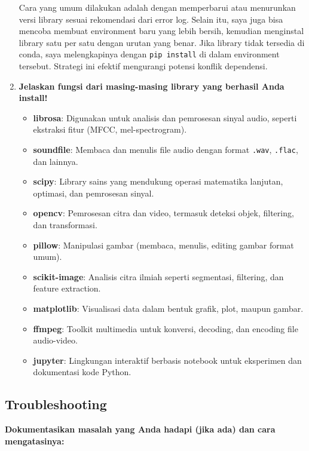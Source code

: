 \documentclass[11pt,a4paper]{article}
\begin{document}
\begin{enumerate}
    Cara yang umum dilakukan adalah dengan memperbarui atau menurunkan versi library sesuai rekomendasi dari error log. Selain itu, saya juga bisa mencoba membuat environment baru yang lebih bersih, kemudian menginstal library satu per satu dengan urutan yang benar. Jika library tidak tersedia di conda, saya melengkapinya dengan \texttt{pip install} di dalam environment tersebut. Strategi ini efektif mengurangi potensi konflik dependensi.
    
    \item \textbf{Jelaskan fungsi dari masing-masing library yang berhasil Anda install!}
    
    \begin{itemize}
        \item \textbf{librosa}: Digunakan untuk analisis dan pemrosesan sinyal audio, seperti ekstraksi fitur (MFCC, mel-spectrogram).
        \item \textbf{soundfile}: Membaca dan menulis file audio dengan format \texttt{.wav}, \texttt{.flac}, dan lainnya.
        \item \textbf{scipy}: Library sains yang mendukung operasi matematika lanjutan, optimasi, dan pemrosesan sinyal.
        \item \textbf{opencv}: Pemrosesan citra dan video, termasuk deteksi objek, filtering, dan transformasi.
        \item \textbf{pillow}: Manipulasi gambar (membaca, menulis, editing gambar format umum).
        \item \textbf{scikit-image}: Analisis citra ilmiah seperti segmentasi, filtering, dan feature extraction.
        \item \textbf{matplotlib}: Visualisasi data dalam bentuk grafik, plot, maupun gambar.
        \item \textbf{ffmpeg}: Toolkit multimedia untuk konversi, decoding, dan encoding file audio-video.
        \item \textbf{jupyter}: Lingkungan interaktif berbasis notebook untuk eksperimen dan dokumentasi kode Python.
    \end{itemize}
\end{enumerate}


\subsection{Troubleshooting}
\textbf{Dokumentasikan masalah yang Anda hadapi (jika ada) dan cara mengatasinya:}
\end{document}
